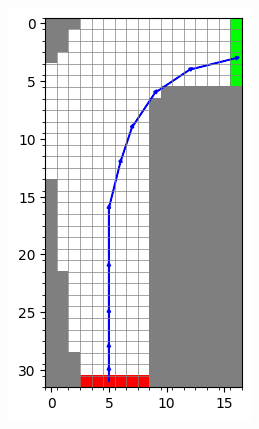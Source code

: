 \begin{figure}[H]
    \centering
    \begin{minipage}[b]{0.35\textwidth}
      \centering
      \includegraphics[width=\textwidth]{chapters_latex/figures/ex_05_12_1.png}
      

\end{minipage}
\end{figure}

